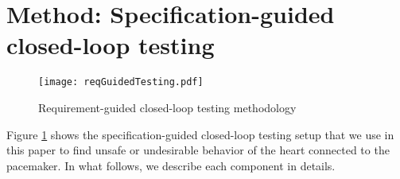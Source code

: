 \section{Method: Specification-guided closed-loop testing}
\label{method}

\begin{figure}[!t]
	\centering
	\texttt{[image: reqGuidedTesting.pdf]}
	\caption{\small Requirement-guided closed-loop testing methodology}
	\label{fig:reqGuidedTesting}
\end{figure} 

Figure \ref{fig:reqGuidedTesting} shows the specification-guided closed-loop testing setup that we use in this paper to find unsafe or undesirable behavior of the heart connected to the pacemaker.
In what follows, we describe each component in details.






